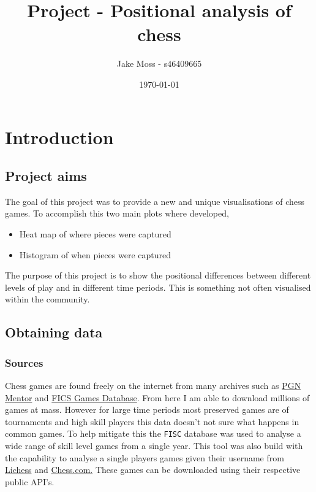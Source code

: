 \documentclass[11pt]{article}
\author{Jake Moss - s46409665}
\date{\today}
\title{Project - Positional analysis of chess}
\begin{document}
\maketitle
\tableofcontents

\newpage

\section{Introduction}
\label{sec:org64b45eb}
\subsection{Project aims}
\label{sec:org02faee4}
The goal of this project was to provide a new and unique visualisations of chess games. To accomplish this two main plots where developed,

\begin{itemize}
\item Heat map of where pieces were captured
\item Histogram of when pieces were captured
\end{itemize}

The purpose of this project is to show the positional differences between different levels of play and in different time periods. This is something not often visualised within the community.
\subsection{Obtaining data}
\label{sec:org018ff36}
\subsubsection{Sources}
\label{sec:orgde62c75}
Chess games are found freely on the internet from many archives such as \href{https://www.pgnmentor.com/files.html}{PGN Mentor} and \href{https://www.ficsgames.org/download.html}{FICS Games Database}. From here I am able to download millions of games at mass. However for large time periods most preserved games are of tournaments and high skill players this data doesn't not sure what happens in common games. To help mitigate this the \texttt{FISC} database was used to analyse a wide range of skill level games from a single year.
This tool was also build with the capability to analyse a single players games given their username from \href{https://lichess.org/}{Lichess} and \href{https://www.chess.com/}{Chess.com.} These games can be downloaded using their respective public API's.
\end{document}
